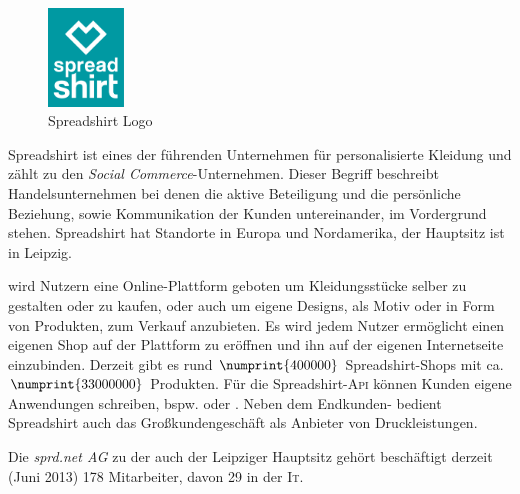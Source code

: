 
\begin{figure}[!htb]
	\centering
		\includegraphics[width=2cm]{resources/sprd_logo_cmyk}
	\caption{Spreadshirt Logo}
	\label{fig:spreadshirtLogo}
\end{figure}

Spreadshirt ist eines der führenden Unternehmen für personalisierte Kleidung und zählt zu den \emph{Social Commerce}-Unternehmen. Dieser Begriff beschreibt Handelsunternehmen bei denen die aktive Beteiligung und die persönliche Beziehung, sowie Kommunikation der Kunden untereinander, im Vordergrund stehen. 
Spreadshirt hat Standorte in Europa und Nordamerika, der Hauptsitz ist in Leipzig. 

wird Nutzern eine Online-Plattform geboten um Kleidungsstücke selber zu gestalten oder zu kaufen, oder auch um eigene Designs, als Motiv oder in Form von Produkten, zum Verkauf anzubieten. 
Es wird jedem Nutzer ermöglicht einen eigenen Shop auf der Plattform zu eröffnen und ihn auf der eigenen Internetseite einzubinden. Derzeit gibt es rund $\numprint{400000}$ Spreadshirt-Shops mit ca. $\numprint{33000000}$ Produkten.
Für die Spreadshirt-\textsc{Api} können Kunden eigene Anwendungen schreiben, bspw.  \cite{zufallsshirt} oder  \cite{soundslikecotton}.
Neben dem Endkunden- bedient Spreadshirt auch das Großkundengeschäft als Anbieter von Druckleistungen.

Die \emph{sprd.net AG} zu der auch der Leipziger Hauptsitz gehört beschäftigt derzeit (Juni 2013) 178 Mitarbeiter, davon 29 in der \textsc{It}.